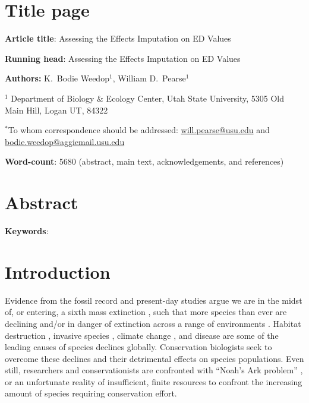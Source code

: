 \documentclass[12pt,english]{article}
\begin{document}
\setlength{\parindent}{0pt}
\section*{Title page}

\textbf{Article title}: Assessing the Effects Imputation on ED Values

\textbf{Running head}: Assessing the Effects Imputation on ED Values

\textbf{Authors:} K.\ Bodie Weedop$^{1}$, William D.\ Pearse$^{1}$\

$^1$ Department of Biology \& Ecology Center, Utah State University,
5305 Old Main Hill, Logan UT, 84322

$^*$To whom correspondence should be addressed:
\url{will.pearse@usu.edu} and \url{bodie.weedop@aggiemail.usu.edu}

\textbf{Word-count}: 5680 (abstract, main text, acknowledgements, and
  references)

\clearpage
\section*{Abstract}


\textbf{Keywords}: 

\clearpage
\section*{Introduction}
Evidence from the fossil record and present-day studies argue we are in the
midst of, or entering, a sixth mass extinction \autocite{Barnosky2011,
Ceballos2015}, such that more species than ever are declining and/or in danger
of extinction across a range of environments \autocite{Wake2008,Thomas2004}.
Habitat destruction \autocite{Brooks2002}, invasive species
\autocite{Molnar2008}, climate change \autocite{Pounds2006}, and disease
\autocite{Lips2006} are some of the leading causes of species declines
globally. Conservation biologists seek to overcome these declines and their
detrimental effects on species populations. Even still, researchers and
conservationists are confronted with ``Noah's Ark problem''
\autocite{Weitzman1998}, or an unfortunate reality of insufficient, finite
resources to confront the increasing amount of species requiring conservation
effort.
\end{document}
